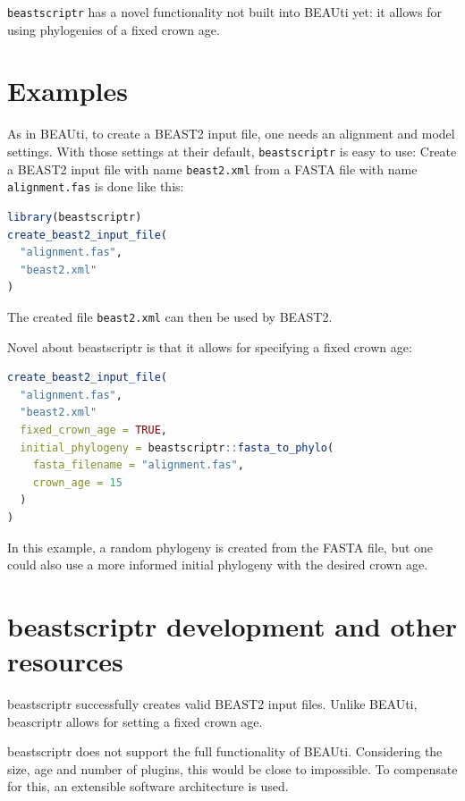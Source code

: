 \documentclass{article}
\begin{document}
\verb;beastscriptr; has a novel functionality not built into BEAUti yet:
it allows for using phylogenies of a fixed crown age. 


\section{Examples}

As in BEAUti, to create a BEAST2 input file, 
one needs an alignment and model settings.
With those settings at their default, \verb;beastscriptr; is easy to use:
Create a BEAST2 input file with name \verb;beast2.xml; from 
a FASTA file with name \verb;alignment.fas; is done like this:

\begin{lstlisting}[language=R, caption=Simplest example]
library(beastscriptr)
create_beast2_input_file(
  "alignment.fas",
  "beast2.xml"
)
\end{lstlisting}

The created file \verb;beast2.xml; can then be used by BEAST2.

Novel about beastscriptr is that it allows for specifying a fixed crown age:

\begin{lstlisting}[language=R, caption=Example with fixed crown age]
create_beast2_input_file(
  "alignment.fas",
  "beast2.xml"
  fixed_crown_age = TRUE,
  initial_phylogeny = beastscriptr::fasta_to_phylo(
    fasta_filename = "alignment.fas", 
    crown_age = 15
  )
)
\end{lstlisting}

In this example, a random phylogeny is created from the FASTA file, but
one could also use a more informed initial phylogeny with the desired crown age. 

\section{beastscriptr development and other resources}

beastscriptr successfully creates valid BEAST2 input files. Unlike BEAUti,
beascriptr allows for setting a fixed crown age.

beastscriptr does not support the full functionality of BEAUti. Considering
the size, age and number of plugins, this would be close to impossible.
To compensate for this, an extensible software architecture is used.
\end{document}
